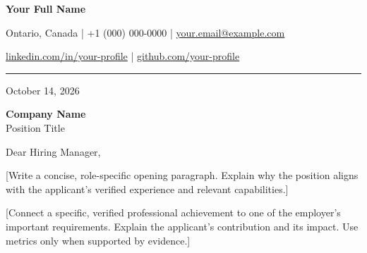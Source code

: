 \documentclass[11pt,a4paper]{letter}
\makeatletter
\newcommand{\ApplicantName}{Your Full Name}
\newcommand{\ApplicantLocation}{Ontario, Canada}
\newcommand{\ApplicantPhone}{+1 (000) 000-0000}
\newcommand{\ApplicantEmail}{your.email@example.com}
\newcommand{\LinkedInURL}{https://linkedin.com/in/your-profile}
\newcommand{\LinkedInText}{linkedin.com/in/your-profile}
\newcommand{\GitHubURL}{https://github.com/your-profile}
\newcommand{\GitHubText}{github.com/your-profile}
\newcommand{\LetterDate}{October 14, 2026}
\newcommand{\HiringManager}{Hiring Manager}
\newcommand{\CompanyName}{Company Name}
\newcommand{\JobTitle}{Position Title}
\newcommand{\CompanyAddress}{}
\makeatother
\begin{document}
\begin{letter}{}

{\fontsize{21}{25}\selectfont
\bfseries\color{accent}\ApplicantName\par}

\vspace{3pt}

{\small
\ApplicantLocation
\quad|\quad
\ApplicantPhone
\quad|\quad
\href{mailto:\ApplicantEmail}{\ApplicantEmail}
\par}

{\small
\href{\LinkedInURL}{\LinkedInText}
\quad|\quad
\href{\GitHubURL}{\GitHubText}
\par}

\vspace{5pt}
{\color{accent}\rule{\linewidth}{1.2pt}}

\vspace{12pt}

\textcolor{muted}{\LetterDate}

\vspace{6pt}

\textbf{\CompanyName}\\
\JobTitle


\vspace{8pt}

Dear \HiringManager,


[Write a concise, role-specific opening paragraph.
Explain why the position aligns with the applicant's
verified experience and relevant capabilities.]


[Connect a specific, verified professional achievement
to one of the employer's important requirements.
Explain the applicant's contribution and its impact.
Use metrics only when supported by evidence.]


\end{letter}
\end{document}
